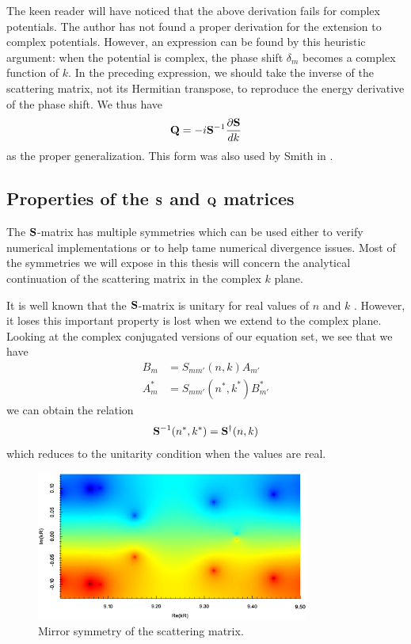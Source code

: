 The keen reader will have noticed that the above derivation
fails for complex potentials. The author has not found a proper
derivation for the extension to complex potentials. However, 
an expression can be found by this heuristic argument:
when the potential is complex, the phase shift $\delta_m$
becomes a complex function of $k$. In the preceding expression, 
we should take the inverse of the scattering matrix, not its Hermitian
transpose, to reproduce the energy derivative of the phase shift.
We thus have
  \begin{equation}
   \mathbf{Q} = -i\mathbf{S}^{-1}\frac{\partial\mathbf{S}}{dk}
  \end{equation}
as the proper generalization. This form was also used by Smith in
\cite{SMI1960}.
  
\subsection{Properties of the $\mathbf{S}$ and $\mathbf{Q}$ matrices}
The $\mathbf{S}$-matrix has multiple symmetries which can be used 
either to verify numerical implementations or to help tame 
numerical divergence issues. Most of the symmetries we will
expose in this thesis will concern the analytical continuation
of the scattering matrix in the complex $k$ plane. 

It is well known that the $\mathbf{S}$-matrix is unitary 
for real values of $n$ and $k$ \cite{NEW1982}. However, 
it loses this important property is lost when we extend
to the complex plane. Looking at the complex conjugated versions
of our equation set, we see that we have
  \begin{align*}
    B_m		&= S_{mm'}(n,k)A_{m'}	\\
    A_m^*	&= S_{mm'}(n^*,k^*)B_{m'}^*
  \end{align*}
we can obtain the relation
  \begin{equation}
    \label{eq:passive.formalism.generalizedSmatrix}
    \mathbf{S}^{-1}(n^*,k^*) = \mathbf{S}^\dagger(n,k)
  \end{equation}
which reduces to the unitarity condition when 
the values are real. 

\begin{figure}
 \centering
 \includegraphics[width=0.8\textwidth]{figs/passive/determinantSmatrix2D.eps}
 \caption[Mirror symmetry of the scattering matrix]
	 {Mirror symmetry of the scattering matrix.}
\end{figure}

